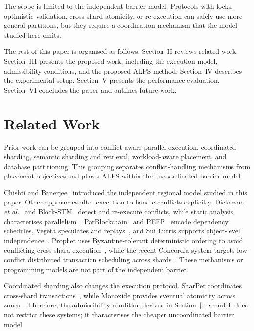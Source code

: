 \documentclass[runningheads]{llncs}
\begin{document}
The scope is limited to the independent-barrier model. Protocols with locks, optimistic validation, cross-shard atomicity, or re-execution can safely use more general partitions, but they require a coordination mechanism that the model studied here omits.

The rest of this paper is organised as follows. Section~II reviews related work. Section~III presents the proposed work, including the execution model, admissibility conditions, and the proposed ALPS method. Section~IV describes the experimental setup. Section~V presents the performance evaluation. Section~VI concludes the paper and outlines future work.

\section{Related Work}

Prior work can be grouped into conflict-aware parallel execution, coordinated
sharding, semantic sharding and retrieval, workload-aware placement, and
database partitioning. This grouping separates conflict-handling mechanisms
from placement objectives and places ALPS within the uncoordinated barrier
model.

Chishti and Banerjee~\cite{chishti2021} introduced the independent regional
model studied in this paper. Other approaches alter execution to handle
conflicts explicitly. Dickerson \emph{et al.}~\cite{dickerson2017} and
Block-STM~\cite{gelashvili2023} detect and re-execute conflicts, while static
analysis characterises parallelism~\cite{bartoletti2021theory}.
ParBlockchain~\cite{amiri2019parblockchain} and PEEP~\cite{chen2021peep}
encode dependency schedules, Vegeta speculates and replays~\cite{xu2025vegeta},
and Sui Lutris supports object-level independence~\cite{blackshear2024sui}.
Prophet uses Byzantine-tolerant deterministic ordering to avoid conflicting
cross-shard execution~\cite{hong2023prophet}, while the recent Concordia system
targets low-conflict distributed transaction scheduling across shards~\cite{liu2026concordia}.
These mechanisms or programming models are not part of the independent barrier.

Coordinated sharding also changes the execution protocol. SharPer coordinates
cross-shard transactions~\cite{amiri2021sharper}, while Monoxide provides
eventual atomicity across zones~\cite{monoxide2019}. Therefore,
the admissibility condition derived in Section~\ref{sec:model} does not restrict
these systems; it characterises the cheaper uncoordinated barrier model.
\end{document}
